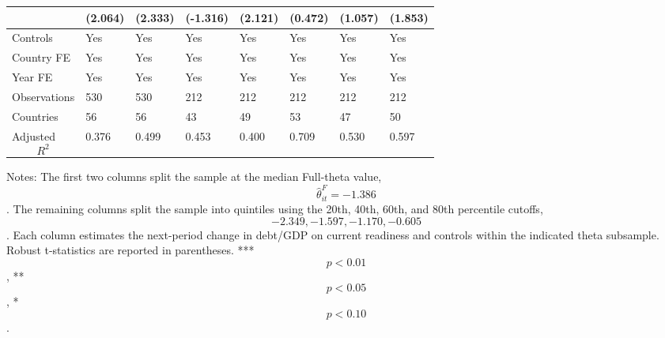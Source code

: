 \begin{table}[H]
\begin{threeparttable}
\begin{tabularx}{\textwidth}{lYYYYYYY}
  & (2.064) & (2.333) & (-1.316) & (2.121) & (0.472) & (1.057) & (1.853) \\
\midrule
Controls & Yes & Yes & Yes & Yes & Yes & Yes & Yes \\
Country FE & Yes & Yes & Yes & Yes & Yes & Yes & Yes \\
Year FE & Yes & Yes & Yes & Yes & Yes & Yes & Yes \\
Observations & 530 & 530 & 212 & 212 & 212 & 212 & 212 \\
Countries & 56 & 56 & 43 & 49 & 53 & 47 & 50 \\
Adjusted $$R^2$$ & 0.376 & 0.499 & 0.453 & 0.400 & 0.709 & 0.530 & 0.597 \\
\bottomrule
\end{tabularx}
\begin{tablenotes}[flushleft]\footnotesize
\item Notes: The first two columns split the sample at the median Full-theta value, $$\widehat{\theta}^{F}_{it}=-1.386$$. The remaining columns split the sample into quintiles using the 20th, 40th, 60th, and 80th percentile cutoffs, $$-2.349, -1.597, -1.170, -0.605$$. Each column estimates the next-period change in debt/GDP on current readiness and controls within the indicated theta subsample. Robust t-statistics are reported in parentheses. *** $$p<0.01$$, ** $$p<0.05$$, * $$p<0.10$$.
\end{tablenotes}
\end{threeparttable}
\end{table}
